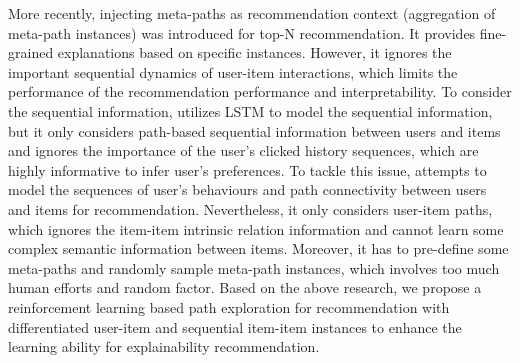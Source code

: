 More recently, injecting meta-paths as recommendation context (aggregation of meta-path instances) \cite{hu2018leveraging} was introduced for top-N recommendation. It provides fine-grained explanations based on specific instances. However, it ignores the important sequential dynamics of user-item interactions, which limits the performance of the recommendation performance and interpretability. To consider the sequential information, \cite{wang2019explainable} utilizes LSTM to model the sequential information, but it only considers path-based sequential information between users and items and ignores the importance of the user's clicked history sequences, which are highly informative to infer user's preferences. To tackle this issue, \cite{zhu2020knowledge} attempts to model the sequences of user's behaviours and path connectivity between users and items for recommendation. Nevertheless, it only considers user-item paths, which ignores the item-item intrinsic relation information and cannot learn some complex semantic information between items. Moreover, it has to pre-define some meta-paths and randomly sample meta-path instances, which involves too much human efforts and random factor. Based on the above research, we propose a reinforcement learning based path exploration for recommendation with differentiated user-item and sequential item-item instances to enhance the learning ability for explainability recommendation.



